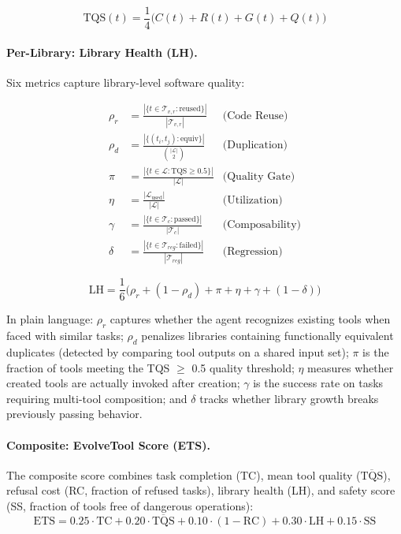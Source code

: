 \documentclass[sigplan,review,anonymous]{acmart}
\begin{document}
\begin{equation}
\text{TQS}(t) = \frac{1}{4}\bigl(C(t) + R(t) + G(t) + Q(t)\bigr)
\end{equation}

\paragraph{Per-Library: Library Health (LH).}
Six metrics capture library-level software quality:

\begin{align}
\rho_r &= \frac{|\{t \in \mathcal{T}_{v,r} : \text{reused}\}|}{|\mathcal{T}_{v,r}|} & \text{(Code Reuse)} \\[2pt]
\rho_d &= \frac{|\{(t_i,t_j) : \text{equiv}\}|}{\binom{|\mathcal{L}|}{2}} & \text{(Duplication)} \\[2pt]
\pi &= \frac{|\{t \in \mathcal{L} : \text{TQS} \geq 0.5\}|}{|\mathcal{L}|} & \text{(Quality Gate)} \\[2pt]
\eta &= \frac{|\mathcal{L}_{\text{used}}|}{|\mathcal{L}|} & \text{(Utilization)} \\[2pt]
\gamma &= \frac{|\{t \in \mathcal{T}_c : \text{passed}\}|}{|\mathcal{T}_c|} & \text{(Composability)} \\[2pt]
\delta &= \frac{|\{t \in \mathcal{T}_{reg} : \text{failed}\}|}{|\mathcal{T}_{reg}|} & \text{(Regression)}
\end{align}

\begin{equation}
\text{LH} = \frac{1}{6}\bigl(\rho_r + (1{-}\rho_d) + \pi + \eta + \gamma + (1{-}\delta)\bigr)
\end{equation}

In plain language: $\rho_r$ captures whether the agent recognizes existing tools when faced with similar tasks; $\rho_d$ penalizes libraries containing functionally equivalent duplicates (detected by comparing tool outputs on a shared input set); $\pi$ is the fraction of tools meeting the TQS $\geq$ 0.5 quality threshold; $\eta$ measures whether created tools are actually invoked after creation; $\gamma$ is the success rate on tasks requiring multi-tool composition; and $\delta$ tracks whether library growth breaks previously passing behavior.

\paragraph{Composite: EvolveTool Score (ETS).}
The composite score combines task completion (TC), mean tool quality ($\overline{\text{TQS}}$), refusal cost (RC, fraction of refused tasks), library health (LH), and safety score (SS, fraction of tools free of dangerous operations):
\begin{equation}
\text{ETS} = 0.25 \!\cdot\! \text{TC} + 0.20 \!\cdot\! \overline{\text{TQS}} + 0.10 \!\cdot\! (1{-}\text{RC}) + 0.30 \!\cdot\! \text{LH} + 0.15 \!\cdot\! \text{SS}
\end{equation}
\end{document}

